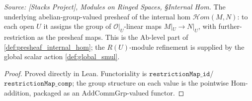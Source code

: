 \begin{definition}

  \label{def:internal_hom_presheaf}
  \textit{Source: [Stacks Project], Modules on Ringed Spaces, \S Internal Hom.}
  The underlying abelian-group-valued presheaf of the internal hom
  \(\mathcal{H}om(M, N)\): to each open \(U\) it assigns the group of
  \(\mathcal{O}|_U\)-linear maps \(M|_U \to N|_U\), with further-restriction as the
  presheaf maps. This is the \(\mathrm{Ab}\)-level part of
  \cref{def:presheaf_internal_hom}; the \(R(U)\)-module refinement is supplied by the
  global scalar action \cref{def:global_smul}.
\end{definition}
\begin{proof}
  \leanok
  Proved directly in Lean. Functoriality is \(\mathtt{restrictionMap\_id}\)/%
  \(\mathtt{restrictionMap\_comp}\); the group structure on each value is the pointwise
  \(\mathrm{Hom}\)-addition, packaged as an \(\mathrm{AddCommGrp}\)-valued functor.
\end{proof}

